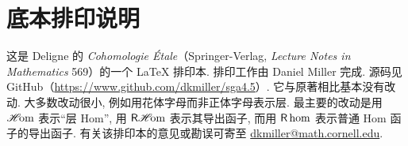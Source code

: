 \chapter*{底本排印说明}
这是 Deligne 的 \emph{Cohomologie Étale}（Springer-Verlag, \emph{Lecture Notes in Mathematics} 569）的一个 \LaTeX{} 排印本. 排印工作由 Daniel Miller 完成. 源码见 GitHub（\url{https://www.github.com/dkmiller/sga4.5}）. 它与原著相比基本没有改动. 大多数改动很小, 例如用花体字母而非正体字母表示层. 最主要的改动是用 $\operatorname{\mathscr{H}\!om}$ 表示“层 Hom”, 用 $\operatorname{\mathsf{R}\mathscr{H}\!om}$ 表示其导出函子, 而用 $\operatorname{\mathsf{R}\hom}$ 表示普通 Hom 函子的导出函子. 有关该排印本的意见或勘误可寄至 \url{dkmiller@math.cornell.edu}.
